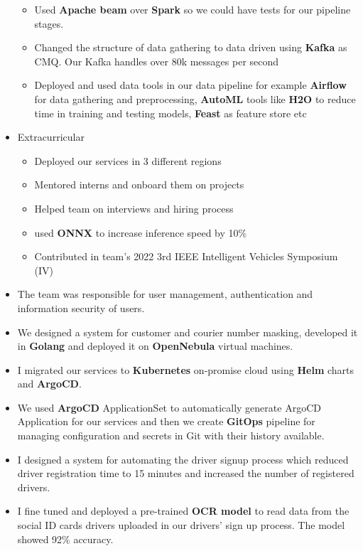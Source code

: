 \begin{itemize}
\begin{itemize}
    \item Used \textbf{Apache beam} over \textbf{Spark} so we could have tests for our pipeline stages.
    \item Changed the structure of data gathering to data driven using \textbf{Kafka} as CMQ. Our Kafka handles over 80k messages per second
    \item Deployed and used data tools in our data pipeline for example \textbf{Airflow} for data gathering and preprocessing, \textbf{AutoML} tools like \textbf{H2O} to reduce time in training and testing models, \textbf{Feast} as feature store etc
  \end{itemize}
  \item Extracurricular
  \begin{itemize}
    \item Deployed our services in 3 different regions
    \item Mentored interns and onboard them on projects
    \item Helped team on interviews and hiring process
    \item used \textbf{ONNX} to increase inference speed by 10\%
    \item Contributed in team's 2022 3rd IEEE Intelligent Vehicles Symposium (IV)
  \end{itemize}
\end{itemize}

\vspace{0.5cm}

\begin{itemize}
  \item The team was responsible for user management, authentication and information security of users.
  \item We designed a system for customer and courier number masking, developed it in \textbf{Golang} and deployed it on \textbf{OpenNebula} virtual machines.
  \item I migrated our services to \textbf{Kubernetes} on‐promise cloud using \textbf{Helm} charts and \textbf{ArgoCD}.
  \item We used \textbf{ArgoCD} ApplicationSet to automatically generate ArgoCD Application for our services and then we create \textbf{GitOps} pipeline for managing configuration and secrets in Git with their history available.
  \item I designed a system for automating the driver signup process which reduced driver registration time to 15 minutes and increased the number of registered drivers.
  \item I fine tuned and deployed a pre-trained \textbf{OCR model} to read data from the social ID cards drivers uploaded in our drivers' sign up process. The model showed 92\% accuracy.
\end{itemize}

